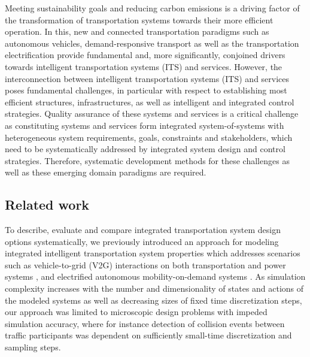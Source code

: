\documentclass[graybox]{svmult}
\begin{document}
Meeting sustainability goals and reducing carbon emissions \cite{sachs2019six} is a driving factor of the transformation of transportation systems towards their more efficient operation.
In this, new and connected transportation paradigms such as autonomous vehicles, demand-responsive transport \cite{brake_demand_2004} as well as the transportation electrification \cite{pereirinha2018main} provide fundamental and, more significantly, conjoined drivers towards intelligent transportation systems (ITS) and services.
However, the interconnection between intelligent transportation systems (ITS) and services poses fundamental challenges, in particular with respect to establishing most efficient structures, infrastructures, as well as intelligent and integrated control strategies.
Quality assurance of these systems and services is a critical challenge as constituting systems and services form integrated system-of-systems with heterogeneous system requirements, goals, constraints and stakeholders, which need to be systematically addressed by integrated system design and control strategies.
Therefore, systematic development methods for these challenges as well as these emerging domain paradigms are required.

\subsection{Related work}

To describe, evaluate and compare integrated transportation system design options systematically, we previously introduced an approach for modeling integrated intelligent transportation system properties which addresses scenarios such as vehicle-to-grid (V2G) interactions on both transportation and power systems \cite{Ascher2015}, \cite{Ascher2016} and electrified autonomous mobility-on-demand systems \cite{Ascher2017}.
As simulation complexity increases with the number and dimensionality of states and actions of the modeled systems as well as decreasing sizes of fixed time discretization steps, our approach was limited to microscopic design problems with impeded simulation accuracy, where for instance detection of collision events between traffic participants was dependent on sufficiently small-time discretization and sampling steps.
\end{document}
